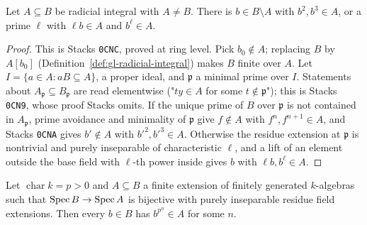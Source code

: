 \begin{lemma}\label{lem:gl-radicial-structure}
\leanok
{}
Let $A\subseteq B$ be radicial integral with $A\ne B$. There is $b\in B\setminus A$ with $b^2,b^3\in A$, or a prime $\ell$ with $\ell b\in A$ and $b^\ell\in A$.
\end{lemma}

\begin{proof}
This is Stacks \texttt{0CNC}, proved at ring level. Pick $b_0\notin A$; replacing $B$ by $A[b_0]$ (Definition~\ref{def:gl-radicial-integral}) makes $B$ finite over
$A$. Let $I=\{a\in A:aB\subseteq A\}$, a proper ideal, and $\mathfrak p$ a minimal prime over $I$. Statements about $A_{\mathfrak p}\subseteq B_{\mathfrak p}$ are read
elementwise ("$ty\in A$ for some $t\notin\mathfrak p$"); this is Stacks \texttt{0CN9}, whose proof Stacks omits. If the unique prime of $B$ over $\mathfrak p$ is not
contained in $A_{\mathfrak p}$, prime avoidance and minimality of $\mathfrak p$ give $f\notin A$ with $f^n,f^{n+1}\in A$, and Stacks \texttt{0CNA} gives $b'\notin A$ with
$b'^2,b'^3\in A$. Otherwise the residue extension at $\mathfrak p$ is nontrivial and purely inseparable of characteristic $\ell$, and a lift of an element outside the
base field with $\ell$-th power inside gives $b$ with $\ell b,b^\ell\in A$.
\end{proof}

\begin{theorem}\label{thm:gl-frobenius-descent}
\leanok
{}
Let $\operatorname{char}k=p>0$ and $A\subseteq B$ a finite extension of finitely generated $k$-algebras such that $\operatorname{Spec} B\to\operatorname{Spec} A$ is bijective with purely
inseparable residue field extensions. Then every $b\in B$ has $b^{p^n}\in A$ for some $n$.
\end{theorem}

